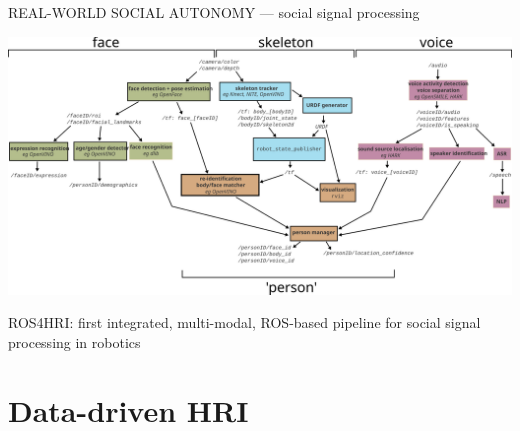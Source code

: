 \documentclass[xcolor=table]{beamer}
\begin{document}
{

\begin{frame}{REAL-WORLD SOCIAL AUTONOMY --- social signal processing}
    \begin{center}
        \includegraphics[width=\columnwidth]{architectures/ros4hri-pipeline}
    \end{center}
    ROS4HRI: first integrated, multi-modal, ROS-based pipeline for social signal
    processing in robotics
\end{frame}
}


\section*{Data-driven HRI}

\end{document}
